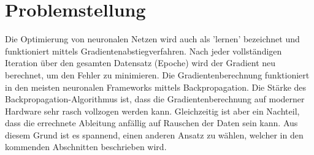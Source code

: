 %
%
%
\section{Problemstellung
\label{ableitung:section:problemstellung}}
Die Optimierung von neuronalen Netzen wird auch als 'lernen' bezeichnet und funktioniert mittels Gradientenabstiegverfahren.
Nach jeder vollständigen Iteration über den gesamten Datensatz (Epoche) wird der Gradient neu berechnet, um den Fehler zu minimieren. Die Gradientenberechnung funktioniert in den meisten neuronalen Frameworks mittels Backpropagation. Die Stärke des Backpropagation-Algorithmus ist, dass die Gradientenberechnung auf moderner Hardware sehr rasch vollzogen werden kann. Gleichzeitig ist aber ein Nachteil, dass die errechnete Ableitung anfällig auf Rauschen der Daten sein kann. Aus diesem Grund ist es spannend, einen anderen Ansatz zu wählen, welcher in den kommenden Abschnitten beschrieben wird.

